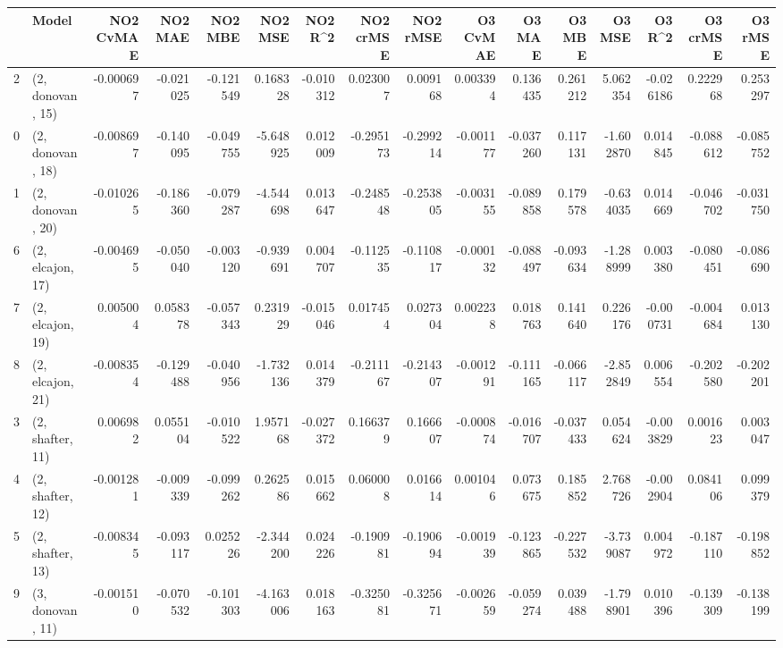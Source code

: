 \begin{tabular}{llrrrrrrrrrrrrrr}
\toprule
{} &             Model &  NO2 CvMAE &   NO2 MAE &   NO2 MBE &    NO2 MSE &   NO2 R\textasciicircum2 &  NO2 crMSE &  NO2 rMSE &  O3 CvMAE &    O3 MAE &    O3 MBE &     O3 MSE &    O3 R\textasciicircum2 &  O3 crMSE &   O3 rMSE \\
\midrule
2  &  (2, donovan, 15) &  -0.000697 & -0.021025 & -0.121549 &   0.168328 & -0.010312 &   0.023007 &  0.009168 &  0.003394 &  0.136435 &  0.261212 &   5.062354 & -0.026186 &  0.222968 &  0.253297 \\
0  &  (2, donovan, 18) &  -0.008697 & -0.140095 & -0.049755 &  -5.648925 &  0.012009 &  -0.295173 & -0.299214 & -0.001177 & -0.037260 &  0.117131 &  -1.602870 &  0.014845 & -0.088612 & -0.085752 \\
1  &  (2, donovan, 20) &  -0.010265 & -0.186360 & -0.079287 &  -4.544698 &  0.013647 &  -0.248548 & -0.253805 & -0.003155 & -0.089858 &  0.179578 &  -0.634035 &  0.014669 & -0.046702 & -0.031750 \\
6  &  (2, elcajon, 17) &  -0.004695 & -0.050040 & -0.003120 &  -0.939691 &  0.004707 &  -0.112535 & -0.110817 & -0.000132 & -0.088497 & -0.093634 &  -1.288999 &  0.003380 & -0.080451 & -0.086690 \\
7  &  (2, elcajon, 19) &   0.005004 &  0.058378 & -0.057343 &   0.231929 & -0.015046 &   0.017454 &  0.027304 &  0.002238 &  0.018763 &  0.141640 &   0.226176 & -0.000731 & -0.004684 &  0.013130 \\
8  &  (2, elcajon, 21) &  -0.008354 & -0.129488 & -0.040956 &  -1.732136 &  0.014379 &  -0.211167 & -0.214307 & -0.001291 & -0.111165 & -0.066117 &  -2.852849 &  0.006554 & -0.202580 & -0.202201 \\
3  &  (2, shafter, 11) &   0.006982 &  0.055104 & -0.010522 &   1.957168 & -0.027372 &   0.166379 &  0.166607 & -0.000874 & -0.016707 & -0.037433 &   0.054624 & -0.003829 &  0.001623 &  0.003047 \\
4  &  (2, shafter, 12) &  -0.001281 & -0.009339 & -0.099262 &   0.262586 &  0.015662 &   0.060008 &  0.016614 &  0.001046 &  0.073675 &  0.185852 &   2.768726 & -0.002904 &  0.084106 &  0.099379 \\
5  &  (2, shafter, 13) &  -0.008345 & -0.093117 &  0.025226 &  -2.344200 &  0.024226 &  -0.190981 & -0.190694 & -0.001939 & -0.123865 & -0.227532 &  -3.739087 &  0.004972 & -0.187110 & -0.198852 \\
9  &  (3, donovan, 11) &  -0.001510 & -0.070532 & -0.101303 &  -4.163006 &  0.018163 &  -0.325081 & -0.325671 & -0.002659 & -0.059274 &  0.039488 &  -1.798901 &  0.010396 & -0.139309 & -0.138199 \\

\end{tabular}
